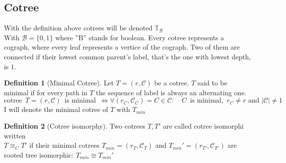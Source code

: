\documentclass[a4paper,12pt]{article}
\theoremstyle{definition}
\newtheorem{definition}{Definition}[section]
\begin{document}
	\subsection{Cotree}
	With the definition above cotrees will be denoted $\mathds{T}_{\mathcal{B}}$\\
	With $\mathcal{B}=\{0,1\}$ where ''B'' stands for boolean.
	Every cotree represents a cograph, where every leaf represents a vertice of the cograph. Two of them are connected if their lowest common parent's label, that's the one with lowest depth, is $1$. 
	\begin{definition}[Minimal Cotree]
		Let $T=(r,\mathcal{C})$ be a cotree. $T$ said to be minimal if for every path in $T$ the sequence of label is always an alternating one.\\
		\[\text{cotree }\, T=(r,\mathcal{C}) \,\text{ is minimal }\, \Longleftrightarrow \forall (r_C,\mathcal{C}_C)=C\in\mathcal{C}:\quad C \,\text{ is minimal, }\, r_C \not = r \text{ and } |\mathcal{C}|\not = 1 \]
		I will denote the minimal cotree of $T$ with $T_{min}$
	\end{definition}
	
	\begin{definition}[Cotree isomorphy]
		Two cotrees $T,T'$ are called cotree isomorphi written \\$T\cong_C T'$ if their minimal cotrees $T_{min}=(r_T,\mathcal{C}_T)$ and $T_{min}'=(r_{T'},\mathcal{C}_{T'})$ are rooted tree isomorphic: 
		$T_{min} \cong T_{min}'$
	\end{definition}
\end{document}
